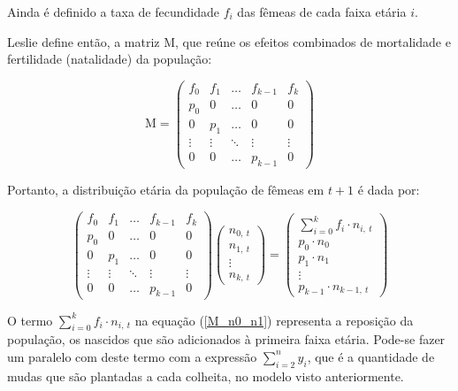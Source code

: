 \documentclass[a4paper, 12pt]{article}
\begin{document}
Ainda é definido a taxa de fecundidade $f_i$ das fêmeas de cada faixa etária $i$. 

Leslie define então, a matriz M, que reúne os efeitos combinados de mortalidade e fertilidade (natalidade) da população:

\begin{equation}\label{matrix_M_leslie}
    \mathrm{M\mathrm{\mathrm{\mathrm{=}}}}\begin{pmatrix}
f_0&f_1&\dots &f_{k-1}&f_k\\
p_0&0&\dots &0&0\\
0&p_1&\dots &0&0\\
\vdots &\vdots &\ddots &\vdots &\vdots \\
0&0&\dots &p_{k-1}&0
\end{pmatrix}
\end{equation}

Portanto, a distribuição etária da população de fêmeas em $t+1$ é dada por:

\begin{equation}\label{M_n0_n1}
    \mathrm{\mathrm{ }}\begin{pmatrix}
f_0&f_1&\dots &f_{k-1}&f_k\\
p_0&0&\dots &0&0\\
0&p_1&\dots &0&0\\
\vdots &\vdots &\ddots &\vdots &\vdots \\
0&0&\dots &p_{k-1}&0
\end{pmatrix}\begin{pmatrix}
n_{0{,}\ t}\\
n_{1{,}\ t}\\
\vdots \\
n_{k{,}\ t}
\end{pmatrix}=\begin{pmatrix}
\sum _{i=0}^kf_i\cdot n_{i{,}\ t}\\
p_0\cdot n_0\\
p_1\cdot n_1\\
\vdots \\
p_{k-1}\cdot n_{k-1{,}\ t}
\end{pmatrix}
\end{equation}

O termo $\sum _{i=0}^kf_i\cdot n_{i{,}\ t}$ na equação (\ref{M_n0_n1}) representa a reposição da população, os nascidos que são adicionados à primeira faixa etária. Pode-se fazer um paralelo com deste termo com a expressão $\sum\limits_{i=2}^{n}y_i$, que é a quantidade de mudas que são plantadas a cada colheita, no modelo visto anteriormente.
\end{document}
